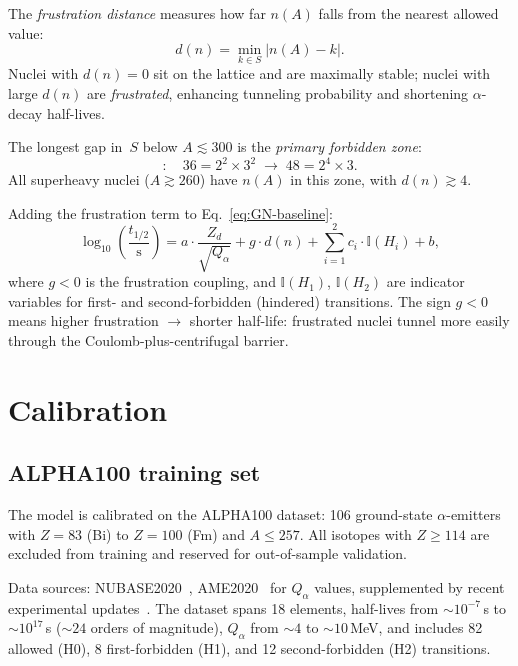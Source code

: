 \documentclass[aps,prc,twocolumn,showpacs,preprintnumbers,amsmath,amssymb]{revtex4-2}
\newcommand{\thalf}{t_{1/2}}
\newcommand{\Qalpha}{Q_\alpha}
\newcommand{\Zd}{Z_d}
\newcommand{\dn}{d(n)}
\begin{document}
The \emph{frustration distance} measures how far $n(A)$ falls from
the nearest allowed value:
\begin{equation}
  \dn = \min_{k \in S} |n(A) - k|.
  \label{eq:dn}
\end{equation}
Nuclei with $\dn = 0$ sit on the lattice and are maximally stable;
nuclei with large $\dn$ are \emph{frustrated}, enhancing
tunneling probability and shortening $\alpha$-decay half-lives.

The longest gap in~$S$ below $A \lesssim 300$ is the
\emph{primary forbidden zone}:
\begin{equation}
  [37, 47]: \quad
  36 = 2^2 \times 3^2 \;\to\; 48 = 2^4 \times 3.
  \label{eq:forbidden}
\end{equation}
All superheavy nuclei ($A \gtrsim 260$) have $n(A)$ in this zone,
with $\dn \gtrsim 4$.

Adding the frustration term to Eq.~\eqref{eq:GN-baseline}:
\begin{equation}
  \log_{10}\!\left(\frac{\thalf}{\text{s}}\right)
    = a \cdot \frac{\Zd}{\sqrt{\Qalpha}}
    + g \cdot \dn
    + \sum_{i=1}^{2} c_i \cdot \mathbb{I}(H_i)
    + b,
  \label{eq:GN-corrected}
\end{equation}
where $g < 0$ is the frustration coupling, and
$\mathbb{I}(H_1)$, $\mathbb{I}(H_2)$ are indicator variables for
first- and second-forbidden (hindered) transitions.
The sign $g < 0$ means higher frustration $\to$ shorter
half-life: frustrated nuclei tunnel more easily through the
Coulomb-plus-centrifugal barrier.

\section{Calibration}
\label{sec:calibration}

\subsection{ALPHA100 training set}

The model is calibrated on the ALPHA100 dataset: 106 ground-state
$\alpha$-emitters with $Z = 83$ (Bi) to $Z = 100$ (Fm) and
$A \leq 257$.  All isotopes with $Z \geq 114$ are excluded from
training and reserved for out-of-sample validation.

Data sources: NUBASE2020~\cite{NUBASE2020},
AME2020~\cite{AME2020} for $\Qalpha$ values, supplemented by
recent experimental updates~\cite{Gates2024}.
The dataset spans 18 elements, half-lives from $\sim 10^{-7}$\,s
to $\sim 10^{17}$\,s ($\sim 24$ orders of magnitude),
$\Qalpha$ from $\sim 4$ to $\sim 10$\,MeV, and includes
82 allowed (H0), 8 first-forbidden (H1), and
12 second-forbidden (H2) transitions.
\end{document}
